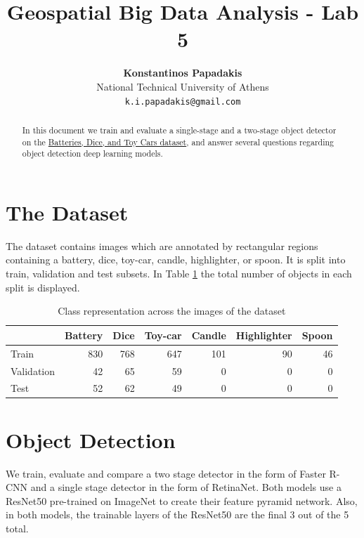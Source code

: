 \documentclass{article}
\title{Geospatial Big Data Analysis - Lab 5}
\author{
    \textbf{Konstantinos Papadakis}\\
    National Technical University of Athens\\
    \texttt{k.i.papadakis@gmail.com}
}
\date{\vspace{-5ex}}
\begin{document}
\maketitle

\begin{abstract}
    In this document we train and evaluate a single-stage and a two-stage object detector on the \href{https://tensorboard.dev/experiment/Xqk1NcDEQBSwa6wCmmAh8w/}{Batteries, Dice, and Toy Cars dataset}, and answer several questions regarding object detection deep learning models.
\end{abstract}

\section{The Dataset}
The dataset contains images which are annotated by rectangular regions containing a battery, dice, toy-car, candle, highlighter, or spoon. It is split into train, validation and test subsets. In Table \ref{table:counts} the total number of objects in each split is displayed.

\begin{table}[h]
    \centering
    \begin{tabular}{lrrrrrr}
        \toprule
                   & Battery & Dice & Toy-car & Candle & Highlighter & Spoon \\
        \midrule
        Train      & 830     & 768  & 647     & 101    & 90          & 46    \\
        Validation & 42      & 65   & 59      & 0      & 0           & 0     \\
        Test       & 52      & 62   & 49      & 0      & 0           & 0     \\
        \bottomrule
    \end{tabular}
    \caption{Class representation across the images of the dataset}
    \label{table:counts}
\end{table}

\section{Object Detection}

We train, evaluate and compare a two stage detector in the form of Faster R-CNN and a single stage detector in the form of RetinaNet. Both models use a ResNet50 pre-trained on ImageNet to create their feature pyramid network. Also, in both models, the trainable layers of the ResNet50 are the final 3 out of the 5 total.
\end{document}
